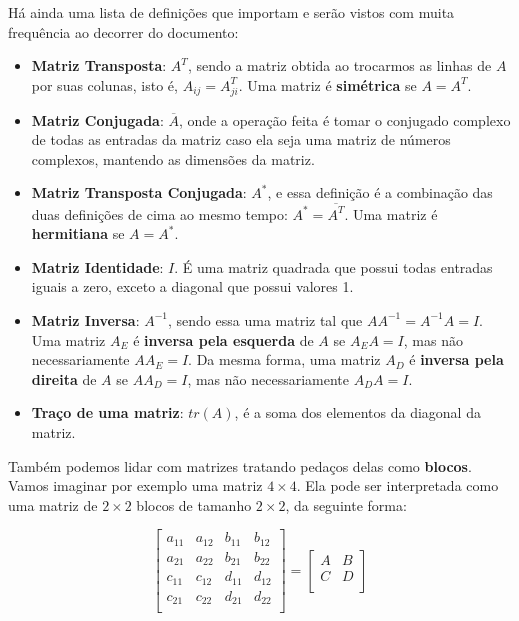 \documentclass[11pt, a4paper]{article}
\begin{document}
Há ainda uma lista de definições que importam e serão vistos com muita frequência ao decorrer do documento:

\begin{itemize}
    \item \textbf{Matriz Transposta}: \(A^T\), sendo a matriz obtida ao trocarmos as linhas de \(A\) por suas colunas, isto é, \(A_{ij}=A^T_{ji}\). Uma matriz é \textbf{simétrica} se \(A=A^T\).

    \item \textbf{Matriz Conjugada}: \(\overline{A}\), onde a operação feita é tomar o conjugado complexo de todas as entradas da matriz caso ela seja uma matriz de números complexos, mantendo as dimensões da matriz.

    \item \textbf{Matriz Transposta Conjugada}: \(A^*\), e essa definição é a combinação das duas definições de cima ao mesmo tempo: \(A^*=\overline{A^T}\). Uma matriz é \textbf{hermitiana} se \(A=A^*\).

    \item \textbf{Matriz Identidade}: \(I\). É uma matriz quadrada que possui todas entradas iguais a zero, exceto a diagonal que possui valores 1.

    \item \textbf{Matriz Inversa}: \(A^{-1}\), sendo essa uma matriz tal que \(AA^{-1}=A^{-1}A=I\). Uma matriz \(A_E\) é \textbf{inversa pela esquerda} de \(A\) se \(A_EA=I\), mas não necessariamente \(AA_E=I\). Da mesma forma, uma matriz \(A_D\) é \textbf{inversa pela direita} de \(A\) se \(AA_D=I\), mas não necessariamente \(A_DA=I\).

    \item \textbf{Traço de uma matriz}: \(tr(A)\), é a soma dos elementos da diagonal da matriz.
\end{itemize}

Também podemos lidar com matrizes tratando pedaços delas como \textbf{blocos}. Vamos imaginar por exemplo uma matriz \(4 \times 4\). Ela pode ser interpretada como uma matriz de \(2 \times 2\) blocos de tamanho \(2 \times 2\), da seguinte forma:

\void[-0.8]

\[
\begin{bmatrix}
a_{11} & a_{12} & b_{11} & b_{12}\\
a_{21} & a_{22} & b_{21} & b_{22}\\
c_{11} & c_{12} & d_{11} & d_{12}\\
c_{21} & c_{22} & d_{21} & d_{22}\\
\end{bmatrix}
=
\begin{bmatrix}
    A & B\\
    C & D\\
\end{bmatrix}
\]
\end{document}

